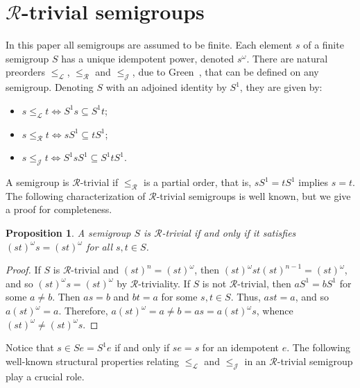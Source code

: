 \documentclass[reqno,11pt]{amsart}
\newcommand{\J}{\mathrel{\mathscr J}} %
\newcommand{\R}{\mathrel{\mathscr R}} %
\newtheorem{Prop}[Thm]{Proposition}
\numberwithin{equation}{section}
\begin{document}
\section{$\mathscr R$-trivial semigroups}
In this paper all semigroups are assumed to be finite.   Each element $s$ of a finite semigroup $S$ has a unique idempotent power, denoted $s^\omega$.
There are natural  preorders $\leq_{\mathscr L}$, $\leq_{\mathscr R}$ and $\leq_{\J}$, due to Green~\cite{Green}, that can be defined on any semigroup.  Denoting $S$ with an adjoined identity by $S^1$, they are given by:

\begin{itemize}
    \item $s\leq_{\mathscr L} t\iff S^1s\subseteq S^1t$;
    \item $s\leq_{\mathscr R} t\iff sS^1\subseteq tS^1$;
    \item $s\leq_{\mathscr J} t\iff S^1sS^1\subseteq S^1tS^1$.
\end{itemize}

A semigroup is $\mathscr R$-trivial if $\leq_{\mathscr R}$ is a partial order, that is, $sS^1=tS^1$ implies $s=t$.  The following characterization of $\mathscr R$-trivial semigroups is well known, but we give a proof for completeness.


\begin{Prop}\label{p:R-trivial.char}
A semigroup $S$ is $\mathscr R$-trivial if and only if it satisfies $(st)^\omega s=(st)^\omega$ for all $s,t\in S$.    
\end{Prop}
\begin{proof}
    If $S$ is $\mathscr R$-trivial and $(st)^n=(st)^\omega$, then $(st)^\omega st(st)^{n-1} = (st)^\omega$, and so $(st)^\omega s=(st)^\omega$ by $\mathscr R$-triviality.  If $S$ is not $\mathscr R$-trivial, then $aS^1=bS^1$ for some $a\neq b$.  Then $as=b$ and $bt=a$ for some $s,t\in S$.  Thus, $ast=a$, and so $a(st)^\omega=a$.  Therefore, $a(st)^\omega = a\neq b=as=a(st)^\omega s$, whence $(st)^\omega\neq (st)^\omega s$.   
\end{proof}

Notice that $s\in Se=S^1e$ if and only if $se=s$ for an idempotent $e$.
The following well-known structural properties relating $\leq_{\mathscr L}$ and $\leq_\mathscr J$ in an $\R$-trivial semigroup play a crucial role.  
\end{document}
